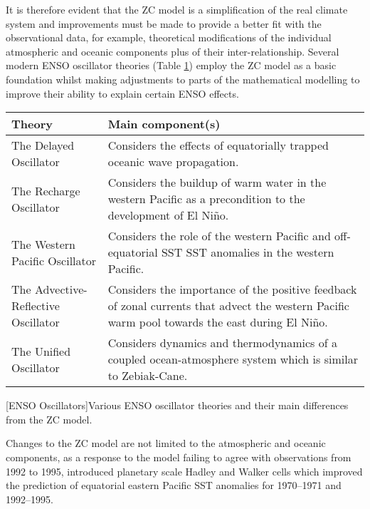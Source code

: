 \documentclass[12pt, onecolumn]{revtex4}    %
\begin{document}
It is therefore evident that the ZC model is a simplification of the real climate system and improvements must be made to provide a better fit with the observational data, for example, theoretical modifications of the individual atmospheric and oceanic components plus of their inter-relationship. Several modern ENSO oscillator theories (Table \ref{table:enso_oscillators}) employ the ZC model as a basic foundation whilst making adjustments to parts of the mathematical modelling to improve their ability to explain certain ENSO effects.

\begin{table}[htbp]
\renewcommand{\arraystretch}{1.0}
\begin{tabular}{|p{7cm}|p{9cm}|}
 \hline
 \textbf{Theory} & \textbf{Main component(s)} \\ [0.5ex] 
 \hline
 The Delayed Oscillator \citep{Suarez:1988aa, Battisti:1988aa} & Considers the effects of equatorially trapped oceanic wave propagation. \\
 \hline
 The Recharge Oscillator \citep{Jin:1997aa} & Considers the buildup of warm water in the western Pacific as a precondition to the development of El Ni\~{n}o. \\
 \hline
 The Western Pacific Oscillator \citep{Weisberg:1997aa, wang1999effects} & Considers the role of the western Pacific and off-equatorial SST SST anomalies in the western Pacific. \\
 \hline
 The Advective-Reflective Oscillator \citep{Picaut663} & Considers the importance of the positive feedback of zonal currents that advect the western Pacific warm pool towards the east during El Ni\~{n}o.  \\
 \hline
 The Unified Oscillator \citep{wang2001unified} & Considers dynamics and thermodynamics of a coupled ocean-atmosphere system which is similar to Zebiak-Cane. \\
 \hline
\end{tabular}
[ENSO Oscillators]{Various ENSO oscillator theories and their main differences from the ZC model.}
\label{table:enso_oscillators}
\end{table}

Changes to the ZC model are not limited to the atmospheric and oceanic components, as a response to the model failing to agree with observations from 1992 to 1995, \cite{qian1997multiple} introduced planetary scale Hadley and Walker cells which improved the prediction of equatorial eastern Pacific SST anomalies for 1970--1971 and 1992--1995. \\
\end{document}

